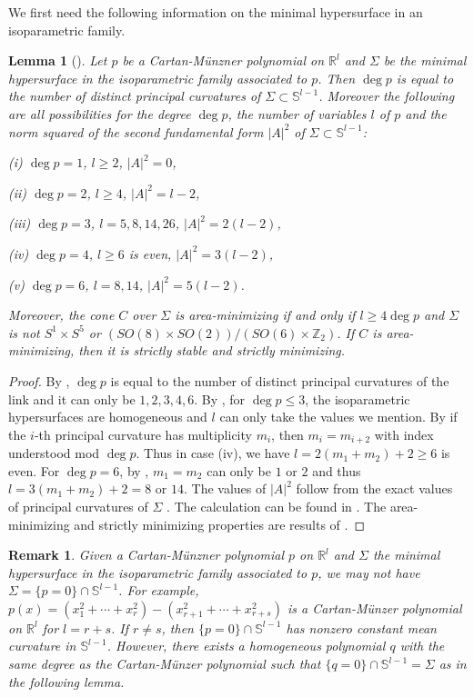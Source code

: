 \documentclass[pdflatex,sn-mathphys-num]{sn-jnl}%
\theoremstyle{thmstyleone}%
\newtheorem{lemma}[theorem]{Lemma}
\theoremstyle{thmstyletwo}%
\newtheorem{remark}{Remark}%
\theoremstyle{thmstylethree}%
\newcommand{\R}{\mathbb{R}}
\newcommand{\SSS}{\mathbb{S}}
\newcommand{\Z}{\mathbb{Z}}
\begin{document}
 We first need the following information on the minimal hypersurface in an isoparametric family.
\begin{lemma}[\cite{Abr,Car,Mu1,Mu2,Wan}]\label{classisop}
	Let $p $ be a Cartan-M\"unzner polynomial on $\R^l$ and  $\Sigma$ be the minimal hypersurface in the isoparametric family associated to $p$. Then $\deg p$ is equal to the number of distinct principal curvatures of  $\Sigma\subset \SSS^{l-1}$. Moreover the following are all possibilities for the degree $\deg p$, the number of variables $l$ of $p$ and the norm squared of the second fundamental form $|A|^2$ of $\Sigma\subset \SSS^{l-1}$:
	
	(i) $\deg p =1$, $l\ge 2$, $|A|^2=0$,
	
	(ii) $\deg p =2$, $l\ge 4$, $|A|^2=l-2$,
	
	(iii) $\deg p =3$, $l=5,8,14,26$, $|A|^2=2(l-2)$,
	
	(iv) $\deg p =4$, $l\ge 6$ is even, $|A|^2=3(l-2)$,
	
	(v) $\deg p =6$, $l=8,14$, $|A|^2=5(l-2)$.
	
	Moreover, the cone $C$ over $\Sigma$ is area-minimizing if and only if $l\ge 4\deg p $ and $\Sigma$ is not $S^1\times S^5$ or $(SO(8)\times SO(2))/(SO(6)\times\Z_2)$. If $C$ is area-minimizing, then it is strictly stable and strictly minimizing.
\end{lemma}

\begin{proof}
	By \cite[Satz A and Satz 2]{Mu1}, $\deg p $ is equal to the number of distinct principal curvatures of the link and it can only be $1,2,3,4,6$. By \cite{Car}, for $\deg p \le 3$, the isoparametric hypersurfaces are homogeneous and $l$ can only take the values we mention. By \cite[Satz 1]{Mu1} if the $i$-th principal curvature has multiplicity $m_i$, then $m_i=m_{i+2}$ with index understood mod $\deg p $. Thus in case (iv), we have $l=2(m_1+m_2)+2\ge 6$ is even. For $\deg p =6$, by \cite{Abr}, $m_1=m_2$ can only be $1$ or $2$ and thus $l=3(m_1+m_2)+2=8$ or $14$. The values of $|A|^2$ follow from the exact values of principal curvatures of $\Sigma$  \cite[Satz 1]{Mu1}. The calculation can be found in \cite[Equations (48) (49) (50), and the formula below (53)]{TZ}. The area-minimizing and strictly minimizing properties are results of \cite{Wan}.
\end{proof}

\begin{remark}
    Given  a Cartan-M\"unzner polynomial $p $ on $\R^l$ and  $\Sigma$ the minimal hypersurface in the isoparametric family associated to $p$, we may not have $\Sigma=\{p=0\}\cap \SSS^{l-1}$. For example, $p(x)=(x_1^2+\cdots+x_r^2)-(x_{r+1}^2+\cdots+x_{r+s}^2)$ is a Cartan-M\"unzer polynomial on $\R^{l}$ for $l=r+s$. If $r\neq s$, then $\{p=0\}\cap \SSS^{l-1}$ has nonzero constant mean curvature in $\SSS^{l-1}$. However, there exists a homogeneous polynomial $q$ with the same degree as the Cartan-M\"unzer polynomial such that $\{q=0\}\cap \SSS^{l-1}=\Sigma$ as in the following lemma.
\end{remark}
\end{document}
